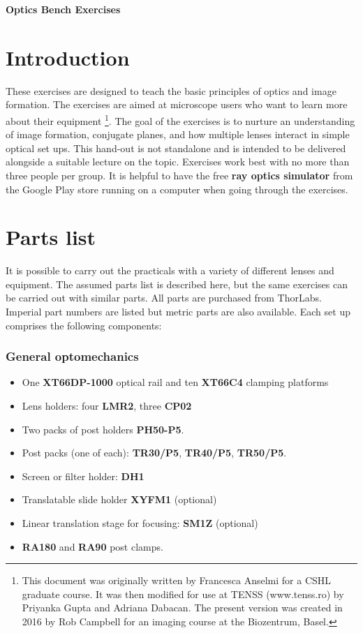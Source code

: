 \documentclass[a4paper]{report}
\begin{document}
\setcounter{secnumdepth}{2}

\begin{center}
\textbf{\Large{Optics Bench Exercises}}
\end{center}

\section{Introduction}
These exercises are designed to teach the basic principles of optics and image formation.
The exercises are aimed at microscope users who want to learn more about their equipment
\footnote{This document was originally written by Francesca Anselmi for a CSHL graduate course.
It was then modified for use at TENSS (www.tenss.ro) by Priyanka Gupta and Adriana Dabacan. 
The present version was created in 2016 by Rob Campbell for an imaging course at the Biozentrum, Basel.}.
The goal of the exercises is to nurture an understanding of image formation, conjugate planes, and how multiple lenses interact in simple optical set ups. 
This hand-out is not standalone and is intended to be delivered alongside a suitable lecture on the topic.
Exercises work best with no more than three people per group.
It is helpful to have the free \textbf{ray optics simulator} from the Google Play store running on a computer when going through the exercises. 

\section{Parts list}
It is possible to carry out the practicals with a variety of different lenses and equipment. 
The assumed parts list is described here, but the same exercises can be carried out with similar parts. 
All parts are purchased from ThorLabs.
Imperial part numbers are listed but metric parts are also available. 
Each set up comprises the following components:


\subsubsection{General optomechanics}
\begin{itemize}
\setlength\itemsep{0.15em}
\item One \textbf{XT66DP-1000} optical rail and ten \textbf{XT66C4} clamping platforms
\item Lens holders: four \textbf{LMR2}, three \textbf{CP02}
\item Two packs of post holders \textbf{PH50-P5}.
\item Post packs (one of each): \textbf{TR30/P5}, \textbf{TR40/P5}, \textbf{TR50/P5}.
\item Screen or filter holder: \textbf{DH1}
\item Translatable slide holder \textbf{XYFM1} (optional)
\item Linear translation stage for focusing: \textbf{SM1Z} (optional)
\item \textbf{RA180} and \textbf{RA90} post clamps.
\end{itemize}
\end{document}
